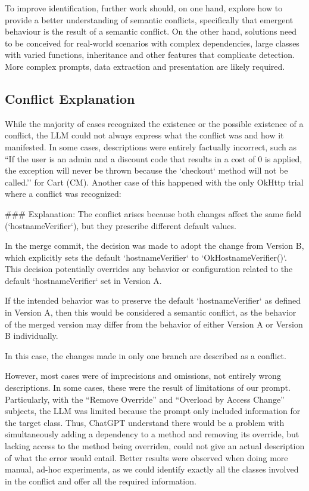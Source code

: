 To improve identification, further work should, on one hand, explore how to provide a better understanding of semantic conflicts, specifically that emergent behaviour is the result of a semantic conflict.
On the other hand, solutions need to be conceived for real-world scenarios with complex dependencies, large classes with varied functions, inheritance and other features that complicate detection. More complex prompts, data extraction and presentation are likely required.

\subsection{Conflict Explanation}

While the majority of cases recognized the existence or the possible existence of a conflict, the LLM could not always express what the conflict was and how it manifested.
In some cases, descriptions were entirely factually incorrect, such as ``If the user is an admin and a discount code that results in a cost of 0 is applied, the exception will never be thrown because the `checkout` method will not be called.'' for Cart (CM). Another case of this happened with the only OkHttp trial where a conflict was recognized:
\begin{response}
### Explanation:
The conflict arises because both changes affect the same field (`hostnameVerifier`), but they prescribe different default values.

In the merge commit, the decision was made to adopt the change from Version B, which explicitly sets the default `hostnameVerifier` to `OkHostnameVerifier()`. This decision potentially overrides any behavior or configuration related to the default `hostnameVerifier` set in Version A.

If the intended behavior was to preserve the default `hostnameVerifier` as defined in Version A, then this would be considered a semantic conflict, as the behavior of the merged version may differ from the behavior of either Version A or Version B individually.
\end{response}
In this case, the changes made in only one branch are described as a conflict.

However, most cases were of imprecisions and omissions, not entirely wrong descriptions. In some cases, these were the result of limitations of our prompt.
Particularly, with the ``Remove Override'' and ``Overload by Access Change'' subjects, the LLM was limited because the prompt only included information for the target class.
Thus, ChatGPT understand there would be a problem with simultaneously adding a dependency to a method and removing its override, but lacking access to the method being overriden,
could not give an actual description of what the error would entail.
Better results were observed when doing more manual, ad-hoc experiments, as we could identify exactly all the classes involved in the conflict and offer all the required information.


